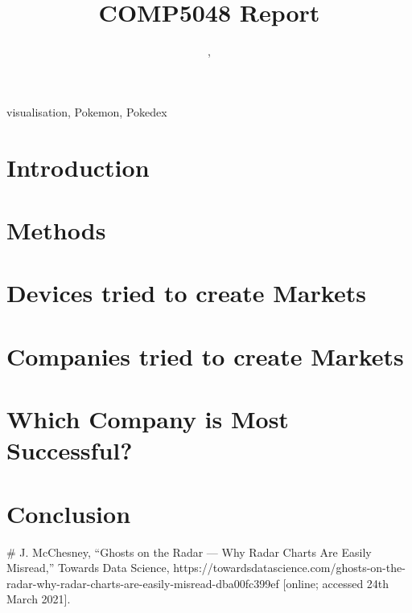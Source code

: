 \documentclass[conference]{IEEEtran}
\begin{document}
\title{COMP5048 Report}

\author{, 
}

\maketitle

\begin{IEEEkeywords}
visualisation, Pokemon, Pokedex
\end{IEEEkeywords}

\section{Introduction}


\section{Methods}


\section{Devices tried to create Markets}


\section{Companies tried to create Markets}


\section{Which Company is Most Successful?}


\section{Conclusion}


\begin{thebibliography}{00}
#  J. McChesney, ``Ghosts on the Radar — Why Radar Charts Are Easily Misread,'' Towards Data Science,  https://towardsdatascience.com/ghosts-on-the-radar-why-radar-charts-are-easily-misread-dba00fc399ef [online; accessed 24th March 2021].
\end{thebibliography}
\end{document}
